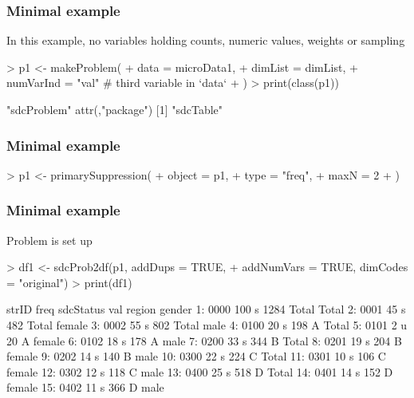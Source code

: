 \documentclass[pdfpagelabels=false, usepdftitle=false]{beamer}
\begin{document}
\begin{frame}[fragile]\frametitle{Minimal example}

In this example, no variables holding counts, numeric values, weights or sampling

\begin{Schunk}
\begin{Sinput}
> p1 <- makeProblem(
+   data = microData1,
+   dimList = dimList,
+   numVarInd = "val" # third variable in `data`
+ )
> print(class(p1))
\end{Sinput}
\begin{Soutput}
[1] "sdcProblem"
attr(,"package")
[1] "sdcTable"
\end{Soutput}
\end{Schunk}
\end{frame}

\begin{frame}[fragile]\frametitle{Minimal example}

\begin{Schunk}
\begin{Sinput}
> p1 <- primarySuppression(
+   object = p1,
+   type = "freq",
+   maxN = 2
+ )
\end{Sinput}
\end{Schunk}

\end{frame}

\begin{frame}[fragile]\frametitle{Minimal example}

Problem is set up

\begin{Schunk}
\begin{Sinput}
> df1 <- sdcProb2df(p1, addDups = TRUE,
+   addNumVars = TRUE, dimCodes = "original")
> print(df1)
\end{Sinput}
\begin{Soutput}
    strID freq sdcStatus  val region gender
 1:  0000  100         s 1284  Total  Total
 2:  0001   45         s  482  Total female
 3:  0002   55         s  802  Total   male
 4:  0100   20         s  198      A  Total
 5:  0101    2         u   20      A female
 6:  0102   18         s  178      A   male
 7:  0200   33         s  344      B  Total
 8:  0201   19         s  204      B female
 9:  0202   14         s  140      B   male
10:  0300   22         s  224      C  Total
11:  0301   10         s  106      C female
12:  0302   12         s  118      C   male
13:  0400   25         s  518      D  Total
14:  0401   14         s  152      D female
15:  0402   11         s  366      D   male
\end{Soutput}
\end{Schunk}
\end{frame}
\end{document}
